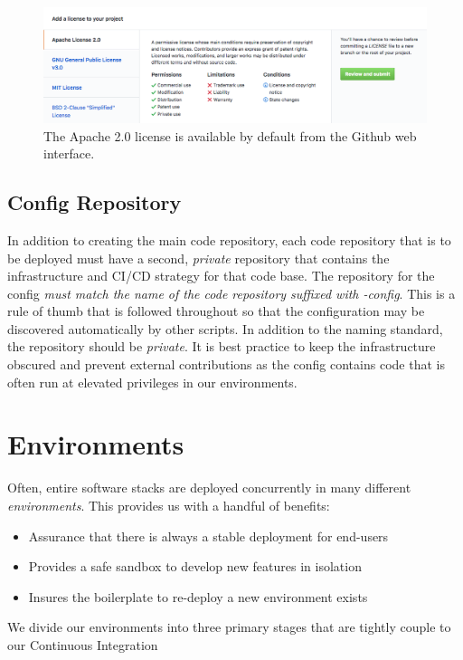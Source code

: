 \documentclass[a4paper,12pt,titlepage]{scrartcl}
\begin{document}
	\begin{figure}
    		\centering
    		\includegraphics[width=0.8\linewidth]{images/license.png}
    		\caption{The Apache 2.0 license is available by default from the Github web interface.}
    		\label{fig:addlicense}
    \end{figure}
	
	\subsection{Config Repository}
	
	In addition to creating the main code repository, each code repository that is to be deployed must have a second, {\em private} repository that contains the infrastructure and CI/CD strategy for that code base.
	The repository for the config {\em must match the name of the code repository suffixed with -config}.
	This is a rule of thumb that is followed throughout so that the configuration may be discovered automatically by other scripts.
	In addition to the naming standard, the repository should be {\em private}.
	It is best practice to keep the infrastructure obscured and prevent external contributions as the config contains code that is often run at elevated privileges in our environments.
	
	\section{Environments}
	
	Often, entire software stacks are deployed concurrently in many different {\em environments}. This provides us with a handful of benefits:
	
	\begin{itemize}  
	\item Assurance that there is always a stable deployment for end-users
	\item Provides a safe sandbox to develop new features in isolation
	\item Insures the boilerplate to re-deploy a new environment exists
	\end{itemize}
	
	We divide our environments into three primary stages that are tightly couple to our Continuous Integration
	
\end{document}

